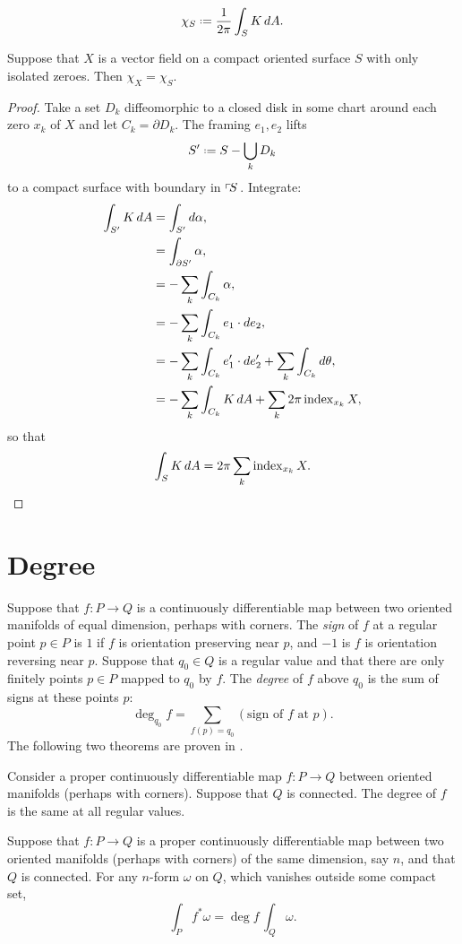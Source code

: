 \[
\chi_S\defeq\frac{1}{2 \pi} \int_S K \, dA.
\]
\begin{theorem}
Suppose that \(X\) is a vector field on a compact oriented surface \(S\) with only isolated zeroes. Then \(\chi_X=\chi_S\).
\end{theorem}
\begin{proof}
Take a set \(D_k\) diffeomorphic to a closed disk in some chart around each zero \(x_k\) of \(X\) and let \(C_k=\partial D_k\).
The framing \(e_1, e_2\) lifts 
\[
S'\defeq S - \bigcup_k D_k
\]
to a compact surface with boundary in \(\left\ulcorner\!S\right.\).
Integrate:
\begin{align*}
\int_{S'} K \, dA
&= \int_{S'} d \alpha,
\\
&= \int_{\partial S'} \alpha,
\\
&= -\sum_k \int_{C_k} \alpha, \\
&= -\sum_k \int_{C_k} e_1 \cdot de_2, \\
&= -\sum_k \int_{C_k} e_1' \cdot de_2' + \sum_k \int_{C_k} d \theta,
\\
&= -\sum_k \int_{C_k} K \, dA + \sum_k 2 \pi \operatorname{index}_{x_k} X,
\end{align*}
so that
\[
\int_S K \, dA = 2 \pi \sum_k \operatorname{index}_{x_k} X.
\]
\end{proof}

\section{Degree}
Suppose that \(f \colon P \to Q\) is a continuously differentiable map between two oriented manifolds of equal dimension, perhaps with corners.  
The \emph{sign}
of \(f\) at a regular point \(p \in P\) is \(1\) if \(f\) is orientation preserving near \(p\), and \(-1\) is \(f\) is orientation reversing near \(p\).
Suppose that \(q_0 \in Q\) is a regular value and that there are only finitely points \(p \in P\) mapped to \(q_0\) by \(f\).
The \emph{degree} of \(f\) above \(q_0\) is the sum of signs at these points \(p\):
\[
\deg_{q_0} f = \sum_{f(p)=q_0} \left(\text{sign of \(f\) at \(p\)}\right).
\]
The following two theorems are proven in \cite{McKay:2018}.
\begin{theorem}
Consider a proper continuously differentiable map \(f \colon P \to Q\) between oriented manifolds (perhaps with corners). 
Suppose that \(Q\) is connected. 
The degree of \(f\) is the same at all regular values.
\end{theorem}
\begin{theorem}
Suppose that \(f \colon P \to Q\) is a proper continuously differentiable map 
between two oriented manifolds (perhaps with corners) of the same dimension, say \(n\), and that \(Q\) is connected. 
For any \(n\)-form \(\omega\) on \(Q\), which vanishes outside some compact set,
\[
\int_P f^* \omega = \deg f \, \int_Q \omega.
\]
\end{theorem}

